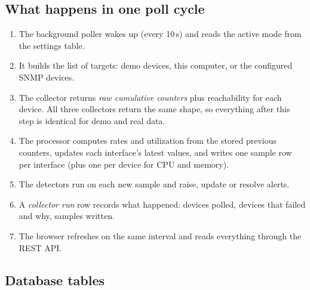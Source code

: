 \documentclass[11pt,a4paper]{article}
\begin{document}
\subsection{What happens in one poll cycle}

\begin{enumerate}
  \item The background poller wakes up (every 10\,s) and reads the active mode from the settings table.
  \item It builds the list of targets: demo devices, this computer, or the configured SNMP devices.
  \item The collector returns \emph{raw cumulative counters} plus reachability for each device. All three collectors return the
        same shape, so everything after this step is identical for demo and real data.
  \item The processor computes rates and utilization from the stored previous counters, updates each interface's latest values,
        and writes one sample row per interface (plus one per device for CPU and memory).
  \item The detectors run on each new sample and raise, update or resolve alerts.
  \item A \emph{collector run} row records what happened: devices polled, devices that failed and why, samples written.
  \item The browser refreshes on the same interval and reads everything through the REST API.
\end{enumerate}

\subsection{Database tables}
\end{document}
